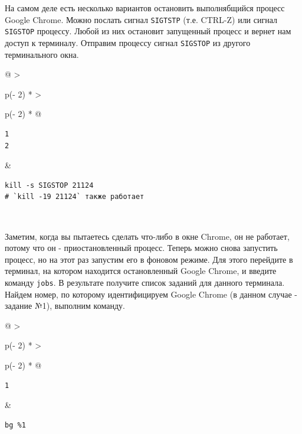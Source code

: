 \documentclass{article}
\begin{document}
На самом деле есть несколько вариантов остановить выполнябщийся процесс
Google Chrome. Можно послать сигнал \texttt{SIGTSTP} (т.е. CTRL-Z) или
сигнал \texttt{SIGSTOP} процессу. Любой из них остановит запущенный
процесс и вернет нам доступ к терминалу. Отправим процессу сигнал
\texttt{SIGSTOP} из другого терминального окна.

\begin{longtable}[]{@{}
  >{\raggedright\arraybackslash}p{(\columnwidth - 2\tabcolsep) * }
  >{\raggedright\arraybackslash}p{(\columnwidth - 2\tabcolsep) * }@{}}
\toprule
\endhead
\begin{minipage}[t]{\linewidth}\raggedright
\begin{verbatim}
1
2
\end{verbatim}
\end{minipage} & \begin{minipage}[t]{\linewidth}\raggedright
\begin{verbatim}
kill -s SIGSTOP 21124
# `kill -19 21124` также работает
\end{verbatim}
\end{minipage} \\ \addlinespace
\bottomrule
\end{longtable}

Заметим, когда вы пытаетесь сделать что-либо в окне Chrome, он не
работает, потому что он - приостановленный процесс. Теперь можно снова
запустить процесс, но на этот раз запустим его в фоновом режиме. Для
этого перейдите в терминал, на котором находится остановленный Google
Chrome, и введите команду \texttt{jobs}. В результате получите список
заданий для данного терминала. Найдем номер, по которому идентифицируем
Google Chrome (в данном случае - задание №1), выполним команду.

\begin{longtable}[]{@{}
  >{\raggedright\arraybackslash}p{(\columnwidth - 2\tabcolsep) * }
  >{\raggedright\arraybackslash}p{(\columnwidth - 2\tabcolsep) * }@{}}
\toprule
\endhead
\begin{minipage}[t]{\linewidth}\raggedright
\begin{verbatim}
1
\end{verbatim}
\end{minipage} & \begin{minipage}[t]{\linewidth}\raggedright
\begin{verbatim}
bg %1
\end{verbatim}
\end{minipage} \\ \addlinespace
\bottomrule
\end{longtable}
\end{document}
